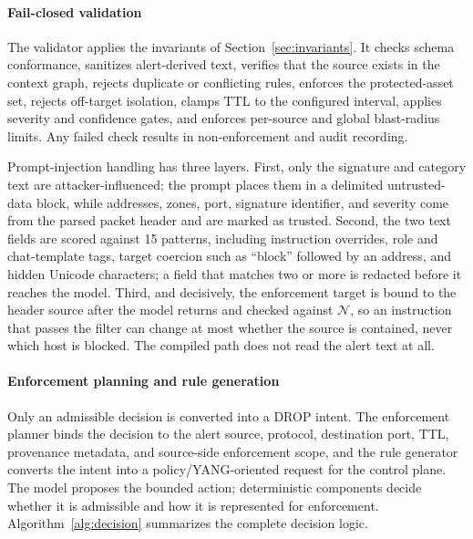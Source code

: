 \documentclass[final,5p]{elsarticle}
\begin{document}
\paragraph{Fail-closed validation}
The validator applies the invariants of Section~\ref{sec:invariants}. It checks schema conformance, sanitizes alert-derived text, verifies that the source exists in the context graph, rejects duplicate or conflicting rules, enforces the protected-asset set, rejects off-target isolation, clamps TTL to the configured interval, applies severity and confidence gates, and enforces per-source and global blast-radius limits. Any failed check results in non-enforcement and audit recording.

Prompt-injection handling has three layers. First, only the signature and category text are attacker-influenced; the prompt places them in a delimited untrusted-data block, while addresses, zones, port, signature identifier, and severity come from the parsed packet header and are marked as trusted. Second, the two text fields are scored against 15 patterns, including instruction overrides, role and chat-template tags, target coercion such as ``block'' followed by an address, and hidden Unicode characters; a field that matches two or more is redacted before it reaches the model. Third, and decisively, the enforcement target is bound to the header source after the model returns and checked against $\mathcal{N}$, so an instruction that passes the filter can change at most whether the source is contained, never which host is blocked. The compiled path does not read the alert text at all.

\paragraph{Enforcement planning and rule generation}
Only an admissible decision is converted into a DROP intent. The enforcement planner binds the decision to the alert source, protocol, destination port, TTL, provenance metadata, and source-side enforcement scope, and the rule generator converts the intent into a policy/YANG-oriented request for the control plane. The model proposes the bounded action; deterministic components decide whether it is admissible and how it is represented for enforcement. Algorithm~\ref{alg:decision} summarizes the complete decision logic.
\end{document}
